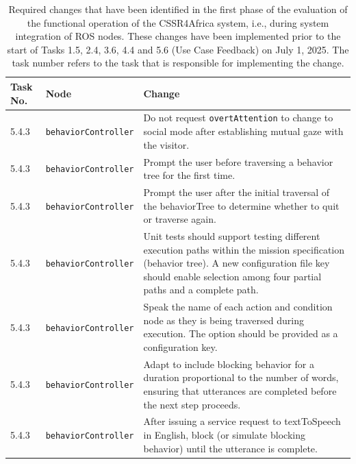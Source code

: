 \documentclass{CSSRforAfrica}
\begin{document}
\begin{center}
\begin{table}[H]
\begin{tabularx}{\linewidth}{| l | l | X |}
\hline 
{\small Task No.}                               & {\small Node }                                                 &  {\small Change}       \\
\hline
{\footnotesize 5.4.3 }  & {\footnotesize \verb+behaviorController+}     & {\footnotesize Do not request \verb+overtAttention+ to change to social mode after establishing mutual gaze with the visitor.   } \\ 
\hline
{\footnotesize 5.4.3  }  & {\footnotesize \verb+behaviorController+}     & {\footnotesize  Prompt the user before traversing a behavior tree for the first time.} \\ 
\hline
{\footnotesize 5.4.3  }  & {\footnotesize \verb+behaviorController+}     & {\footnotesize  Prompt the user after the initial traversal of the behaviorTree to determine whether to quit or traverse again.} \\ 
\hline
{\footnotesize 5.4.3}  & {\footnotesize \verb+behaviorController+}     & {\footnotesize  Unit tests should support testing different execution paths within the mission specification (behavior tree). A new configuration file key should enable selection among four partial paths and a complete path.} \\ 
\hline
{\footnotesize 5.4.3 }  & {\footnotesize \verb+behaviorController+}     & {\footnotesize  Speak the name of each action and condition node as they is being traversed during execution. The option should be provided as a configuration key.} \\ 
\hline
{\footnotesize 5.4.3 }  & {\footnotesize \verb+behaviorController+}     & {\footnotesize  Adapt  to include blocking behavior for a duration proportional to the number of words, ensuring that utterances are completed before the next step proceeds.} \\ 
\hline
{\footnotesize 5.4.3 }  & {\footnotesize \verb+behaviorController+}     & {\footnotesize  After issuing a service request to textToSpeech in English, block (or simulate blocking behavior) until the utterance is complete.} \\ 
\hline
\end{tabularx}
\caption{Required changes that have been identified in the first phase of the evaluation of the functional operation of the CSSR4Africa system, i.e., during system integration of ROS nodes. These changes have been implemented  prior to the start of Tasks  1.5, 2.4, 3.6, 4.4 and 5.6 (Use Case Feedback) on July 1, 2025. The task number refers to the task that is responsible for implementing the change.}
\label{table:phase1a}
\end{table}
\end{center}
\end{document}
